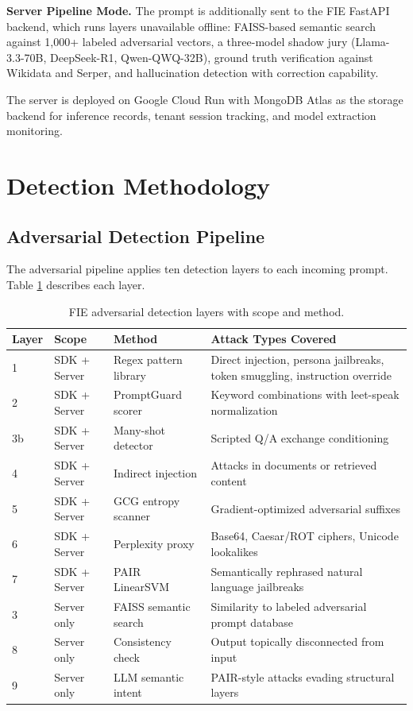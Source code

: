 \documentclass[preprint,12pt,authoryear]{elsarticle}
\begin{document}
\textbf{Server Pipeline Mode.} The prompt is additionally sent to the
FIE FastAPI backend, which runs layers unavailable offline: FAISS-based
semantic search against 1,000+ labeled adversarial vectors, a
three-model shadow jury (Llama-3.3-70B, DeepSeek-R1, Qwen-QWQ-32B),
ground truth verification against Wikidata and Serper, and
hallucination detection with correction capability.

The server is deployed on Google Cloud Run with MongoDB Atlas as the
storage backend for inference records, tenant session tracking, and
model extraction monitoring.

\section{Detection Methodology}
\label{sec:methodology}

\subsection{Adversarial Detection Pipeline}

The adversarial pipeline applies ten detection layers to each incoming
prompt. Table \ref{tab:layers} describes each layer.

\begin{table}[H]
\centering
\caption{FIE adversarial detection layers with scope and method.}
\label{tab:layers}
\begin{tabular}{p{1.0cm} p{2.2cm} p{2.5cm} p{6.8cm}}
\toprule
\textbf{Layer} & \textbf{Scope} & \textbf{Method} & \textbf{Attack Types Covered} \\
\midrule
1  & SDK + Server & Regex pattern library & Direct injection, persona jailbreaks, token smuggling, instruction override \\
2  & SDK + Server & PromptGuard scorer & Keyword combinations with leet-speak normalization \\
3b & SDK + Server & Many-shot detector & Scripted Q/A exchange conditioning \\
4  & SDK + Server & Indirect injection & Attacks in documents or retrieved content \\
5  & SDK + Server & GCG entropy scanner & Gradient-optimized adversarial suffixes \\
6  & SDK + Server & Perplexity proxy & Base64, Caesar/ROT ciphers, Unicode lookalikes \\
7  & SDK + Server & PAIR LinearSVM & Semantically rephrased natural language jailbreaks \\
3  & Server only & FAISS semantic search & Similarity to labeled adversarial prompt database \\
8  & Server only & Consistency check & Output topically disconnected from input \\
9  & Server only & LLM semantic intent & PAIR-style attacks evading structural layers \\
\bottomrule
\end{tabular}
\end{table}
\end{document}
